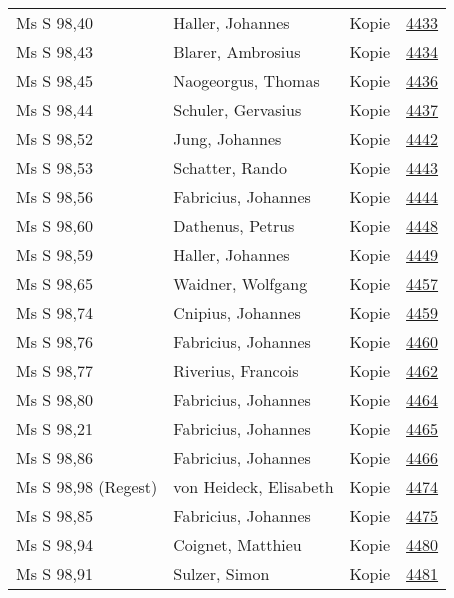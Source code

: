 \documentclass[10pt,a4paper,landscape]{report}
\begin{document}
\begin{longtable}{p{16cm}p{4cm}lr}
Ms S 98,40	&	Haller, Johannes	&	Kopie	&	\href{http://130.60.24.72/assignment/4433}{4433}\\
Ms S 98,43	&	Blarer, Ambrosius	&	Kopie	&	\href{http://130.60.24.72/assignment/4434}{4434}\\
Ms S 98,45	&	Naogeorgus, Thomas	&	Kopie	&	\href{http://130.60.24.72/assignment/4436}{4436}\\
Ms S 98,44	&	Schuler, Gervasius	&	Kopie	&	\href{http://130.60.24.72/assignment/4437}{4437}\\
Ms S 98,52	&	Jung, Johannes	&	Kopie	&	\href{http://130.60.24.72/assignment/4442}{4442}\\
Ms S 98,53	&	Schatter, Rando	&	Kopie	&	\href{http://130.60.24.72/assignment/4443}{4443}\\
Ms S 98,56	&	Fabricius, Johannes	&	Kopie	&	\href{http://130.60.24.72/assignment/4444}{4444}\\
Ms S 98,60	&	Dathenus, Petrus	&	Kopie	&	\href{http://130.60.24.72/assignment/4448}{4448}\\
Ms S 98,59	&	Haller, Johannes	&	Kopie	&	\href{http://130.60.24.72/assignment/4449}{4449}\\
Ms S 98,65	&	Waidner, Wolfgang	&	Kopie	&	\href{http://130.60.24.72/assignment/4457}{4457}\\
Ms S 98,74	&	Cnipius, Johannes	&	Kopie	&	\href{http://130.60.24.72/assignment/4459}{4459}\\
Ms S 98,76	&	Fabricius, Johannes	&	Kopie	&	\href{http://130.60.24.72/assignment/4460}{4460}\\
Ms S 98,77	&	Riverius, Francois	&	Kopie	&	\href{http://130.60.24.72/assignment/4462}{4462}\\
Ms S 98,80	&	Fabricius, Johannes	&	Kopie	&	\href{http://130.60.24.72/assignment/4464}{4464}\\
Ms S 98,21	&	Fabricius, Johannes	&	Kopie	&	\href{http://130.60.24.72/assignment/4465}{4465}\\
Ms S 98,86	&	Fabricius, Johannes	&	Kopie	&	\href{http://130.60.24.72/assignment/4466}{4466}\\
Ms S 98,98 (Regest)	&	von Heideck, Elisabeth	&	Kopie	&	\href{http://130.60.24.72/assignment/4474}{4474}\\
Ms S 98,85	&	Fabricius, Johannes	&	Kopie	&	\href{http://130.60.24.72/assignment/4475}{4475}\\
Ms S 98,94	&	Coignet, Matthieu	&	Kopie	&	\href{http://130.60.24.72/assignment/4480}{4480}\\
Ms S 98,91	&	Sulzer, Simon	&	Kopie	&	\href{http://130.60.24.72/assignment/4481}{4481}\\

\end{longtable}
\end{document}
